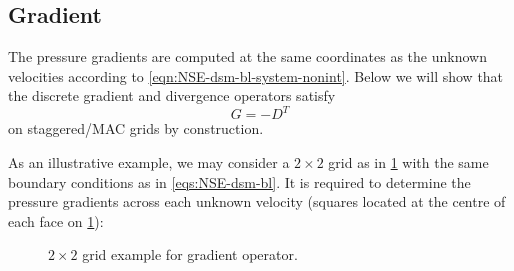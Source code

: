 \documentclass{article}
\numberwithin{equation}{section}
\begin{document}
\subsection{Gradient}\label{subsec:gradient} 

The pressure gradients are computed at the same coordinates as the unknown velocities according to \cref{eqn:NSE-dsm-bl-system-nonint}. Below we will show that the discrete gradient and divergence operators satisfy
\begin{equation}\label{eqn:g-dt}
  {G}=-{D^T}
\end{equation}
on staggered/MAC grids by construction. 

As an illustrative example, we may consider a $2\times 2$ grid as in \cref{fig:G-example-2x2} with the same boundary conditions as in \cref{eqs:NSE-dsm-bl}. It is required to determine the pressure gradients across each unknown velocity (squares located at the centre of each face on \cref{fig:G-example-2x2}):

\begin{figure}[H] %
  \caption{$2\times 2$ grid example for gradient operator.}\label{fig:G-example-2x2}
\end{figure}
\end{document}
